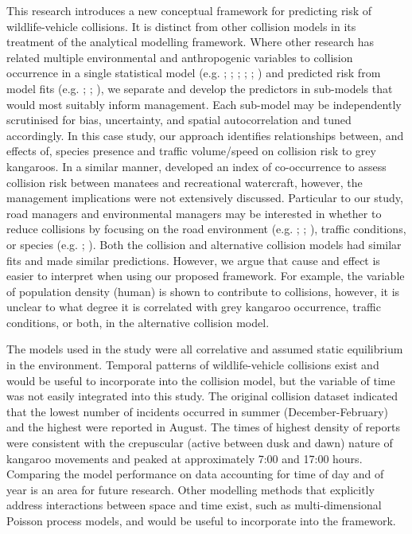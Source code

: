 This research introduces a new conceptual framework for predicting risk of wildlife-vehicle collisions. It is distinct from other collision models in its treatment of the analytical modelling framework. Where other research has related multiple environmental and anthropogenic variables to collision occurrence in a single statistical model (e.g. \cite{lee04}; \cite{ramp05}; \cite{kloc06}; \cite{litv08}; \cite{guns09}; \cite{roge09}) and predicted risk from model fits (e.g. \cite{malo04}; \cite{sudh09}; \cite{guns12}), we separate and develop the predictors in sub-models that would most suitably inform management. Each sub-model may be independently scrutinised for bias, uncertainty, and spatial autocorrelation and tuned accordingly. In this case study, our approach identifies relationships between, and effects of, species presence and traffic volume/speed on collision risk to grey kangaroos. In a similar manner, \cite{baud13} developed an index of co-occurrence to assess collision risk between manatees and recreational watercraft, however, the management implications were not extensively discussed. Particular to our study, road managers and environmental managers may be interested in whether to reduce collisions by focusing on the road environment (e.g. \cite{clev01}; \cite{jaeg04}; \cite{bond08,bond13}), traffic conditions, or species (e.g. \cite{huij03}; \cite{huij06}). Both the collision and alternative collision models had similar fits and made similar predictions. However, we argue that cause and effect is easier to interpret when using our proposed framework. For example, the variable of population density (human) is shown to contribute to collisions, however, it is unclear to what degree it is correlated with grey kangaroo occurrence, traffic conditions, or both, in the alternative collision model.

The models used in the study were all correlative and assumed static equilibrium in the environment. Temporal patterns of wildlife-vehicle collisions exist and would be useful to incorporate into the collision model, but the variable of time was not easily integrated into this study. The original collision dataset indicated that the lowest number of incidents occurred in summer (December-February) and the highest were reported in August. The times of highest density of reports were consistent with the crepuscular (active between dusk and dawn) nature of kangaroo movements \citep{mccu00} and peaked at approximately 7:00 and 17:00 hours. Comparing the model performance on data accounting for time of day and of year is an area for future research. Other modelling methods that explicitly address interactions between space and time exist, such as multi-dimensional Poisson process models, and would be useful to incorporate into the framework.

